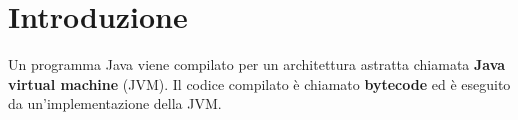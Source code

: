 \documentclass[a4paper]{article}
\begin{document}


\tableofcontents
\pagebreak

\section{Introduzione}
Un programma Java viene compilato per un architettura astratta chiamata \textbf{Java
virtual machine} (JVM). Il codice compilato è chiamato \textbf{bytecode} ed è
eseguito da un'implementazione della JVM.
\end{document}
